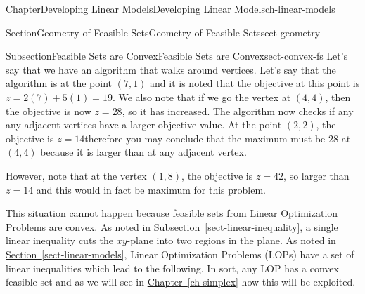 \documentclass[oneside,10pt,]{book}
\newcommand{\xreffont}{\relax}
\numberwithin{equation}{section}
\begin{document}
\begin{chapterptx}{Chapter}{Developing Linear Models}{}{Developing Linear Models}{}{}{ch-linear-models}
\begin{sectionptx}{Section}{Geometry of Feasible Sets}{}{Geometry of Feasible Sets}{}{}{sect-geometry}
\begin{subsectionptx}{Subsection}{Feasible Sets are Convex}{}{Feasible Sets are Convex}{}{}{sect-convex-fs}
Let's say that we have an algorithm that walks around vertices. Let's say that the algorithm is at the point \((7,1)\) and it is noted that the objective at this point is \(z = 2(7) + 5(1) = 19\). We also note that if we go the vertex at \((4,4)\), then the objective is now \(z = 28\), so it has increased. The algorithm now checks if any any adjacent vertices have a larger objective value. At the point \((2,2)\), the objective is \(z=14\)therefore you may conclude that the maximum must be 28  at \((4,4)\) because it is larger than at any adjacent vertex.%
\par
However, note that at the vertex \((1,8)\), the objective is \(z=42\), so larger than \(z=14\) and this would in fact be maximum for this problem.%
\par
This situation cannot happen because feasible sets from Linear Optimization Problems are convex. As noted in \hyperref[sect-linear-inequality]{Subsection~{\xreffont\ref{sect-linear-inequality}}}, a single linear inequality cuts the \(xy\)-plane into two regions in the plane. As noted in \hyperref[sect-linear-models]{Section~{\xreffont\ref{sect-linear-models}}}, Linear Optimization Problems (LOPs) have a set of linear inequalities which lead to the following. In sort, any LOP has a convex feasible set and as we will see in \hyperref[ch-simplex]{Chapter~{\xreffont\ref{ch-simplex}}} how this will be exploited.%
\end{subsectionptx}
\end{sectionptx}
\end{chapterptx}
%
%
\typeout{************************************************}
\typeout{************************************************}
%
\end{document}
